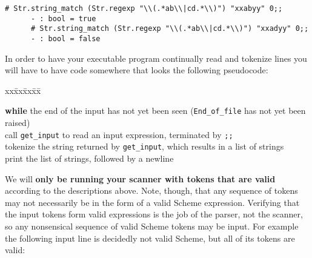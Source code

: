 \documentclass[11pt]{article}
\begin{document}
    \begin{center}

      \begin{BVerbatim}[gobble=6]
      # Str.string_match (Str.regexp "\\(.*ab\\|cd.*\\)") "xxabyy" 0;;
      - : bool = true
      # Str.string_match (Str.regexp "\\(.*ab\\|cd.*\\)") "xxadyy" 0;;
      - : bool = false
      \end{BVerbatim}

    \end{center}

    In order to have your executable program continually read and tokenize
  lines you will have to have code somewhere that looks the following
  pseudocode:

    \medskip

    \hspace{4mm}
    \begin{minipage}[t]{3in}

      \begin{tabbing}


        xx\=xx\=xx\=xx\=\kill

        \textbf{while} the end of the input has not yet been seen
        (\texttt{End\_of\_file} has not yet been raised)
          \\

          \> call \texttt{get\_input} to read an input expression, terminated
             by \texttt{;;}
             \\

          \> tokenize the string returned by \texttt{get\_input}, which
             results in a list of strings
             \\

          \> print the list of strings, followed by a newline

      \end{tabbing}

    \end{minipage}

    \bigskip

    We will \textbf{only be running your scanner with tokens that are valid}
  according to the descriptions above.  Note, though, that any sequence of
  tokens may not necessarily be in the form of a valid Scheme expression.
  Verifying that the input tokens form valid expressions is the job of the
  parser, not the scanner, so any nonsensical sequence of valid Scheme
  tokens may be input.  For example the following input line is decidedly
  not valid Scheme, but all of its tokens are valid:
\end{document}
